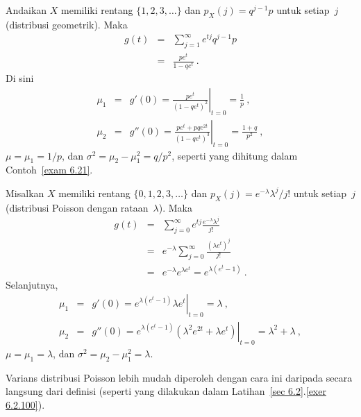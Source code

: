 \begin{example}\label{exam 10.3}
Andaikan $X$ memiliki rentang $\{1,2,3,\ldots\}$ dan $p_X(j) = q^{j - 1}p$ untuk setiap~$j$
(distribusi geometrik).  Maka
\begin{eqnarray*}
g(t) &=& \sum_{j = 1}^\infty e^{tj} q^{j - 1}p \\
     &=& \frac {pe^t}{1 - qe^t}\ .
\end{eqnarray*}
Di sini
\begin{eqnarray*}
\mu_1 &=& g'(0) = \left. \frac {pe^t}{(1 - qe^t)^2} \right|_{t = 0} = \frac 1p\ , \\
\mu_2 &=& g''(0) = \left. \frac {pe^t + pqe^{2t}}{(1 - qe^t)^3} \right|_{t = 0} = \frac
{1 + q}{p^2}\ ,
\end{eqnarray*}
$\mu = \mu_1 = 1/p$, dan $\sigma^2 = \mu_2 - \mu_1^2 = q/p^2$, seperti yang dihitung dalam
Contoh~\ref{exam 6.21}.
\end{example}

\begin{example}\label{exam 10.4}
Misalkan $X$ memiliki rentang $\{0,1,2,3,\ldots\}$ dan $p_X(j) =
e^{-\lambda}\lambda^j/j!$ untuk setiap~$j$ (distribusi Poisson dengan rataan~$\lambda$). 
Maka
\begin{eqnarray*}
g(t) &=& \sum_{j = 0}^\infty e^{tj} \frac {e^{-\lambda}\lambda^j}{j!} \\
     &=& e^{-\lambda} \sum_{j = 0}^\infty \frac {(\lambda e^t)^j}{j!} \\
     &=& e^{-\lambda} e^{\lambda e^t} = e^{\lambda(e^t - 1)}\ .
\end{eqnarray*}
Selanjutnya,
\begin{eqnarray*}
\mu_1 &=& g'(0) = \left. e^{\lambda(e^t - 1)}\lambda e^t \right|_{t = 0} = \lambda\ ,\\
\mu_2 &=& g''(0) = \left. e^{\lambda(e^t - 1)} (\lambda^2 e^{2t} + \lambda e^t)
\right|_{t = 0} = \lambda^2 + \lambda\ ,
\end{eqnarray*} 
$\mu = \mu_1 = \lambda$, dan $\sigma^2 = \mu_2 - \mu_1^2 = \lambda$.
\par
Varians distribusi Poisson lebih mudah diperoleh dengan cara ini daripada secara langsung
dari definisi (seperti yang dilakukan dalam Latihan~\ref{sec 6.2}.\ref{exer 6.2.100}).
\end{example}

